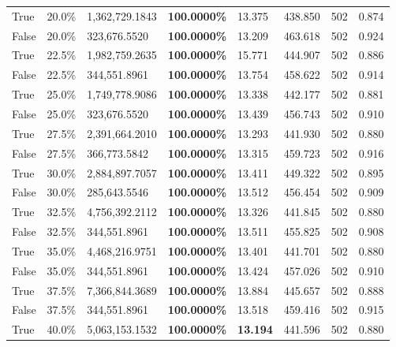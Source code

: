 \begin{table}[H]
\begin{tabular}{lllrllll}
\cline{1-8}
True & 20.0\% & 1,362,729.1843 & \bfseries \color{red} 100.0000\% & 13.375 & 438.850 & 502 & 0.874 \\
\cline{1-8}
False & 20.0\% & 323,676.5520 & \bfseries \color{red} 100.0000\% & 13.209 & 463.618 & 502 & 0.924 \\
\cline{1-8}
True & 22.5\% & 1,982,759.2635 & \bfseries \color{red} 100.0000\% & 15.771 & 444.907 & 502 & 0.886 \\
\cline{1-8}
False & 22.5\% & 344,551.8961 & \bfseries \color{red} 100.0000\% & 13.754 & 458.622 & 502 & 0.914 \\
\cline{1-8}
True & 25.0\% & 1,749,778.9086 & \bfseries \color{red} 100.0000\% & 13.338 & 442.177 & 502 & 0.881 \\
\cline{1-8}
False & 25.0\% & 323,676.5520 & \bfseries \color{red} 100.0000\% & 13.439 & 456.743 & 502 & 0.910 \\
\cline{1-8}
True & 27.5\% & 2,391,664.2010 & \bfseries \color{red} 100.0000\% & 13.293 & 441.930 & 502 & 0.880 \\
\cline{1-8}
False & 27.5\% & 366,773.5842 & \bfseries \color{red} 100.0000\% & 13.315 & 459.723 & 502 & 0.916 \\
\cline{1-8}
True & 30.0\% & 2,884,897.7057 & \bfseries \color{red} 100.0000\% & 13.411 & 449.322 & 502 & 0.895 \\
\cline{1-8}
False & 30.0\% & \color{red} 285,643.5546 & \bfseries \color{red} 100.0000\% & 13.512 & 456.454 & 502 & 0.909 \\
\cline{1-8}
True & 32.5\% & 4,756,392.2112 & \bfseries \color{red} 100.0000\% & 13.326 & 441.845 & 502 & 0.880 \\
\cline{1-8}
False & 32.5\% & 344,551.8961 & \bfseries \color{red} 100.0000\% & 13.511 & 455.825 & 502 & 0.908 \\
\cline{1-8}
True & 35.0\% & 4,468,216.9751 & \bfseries \color{red} 100.0000\% & 13.401 & 441.701 & 502 & 0.880 \\
\cline{1-8}
False & 35.0\% & 344,551.8961 & \bfseries \color{red} 100.0000\% & 13.424 & 457.026 & 502 & 0.910 \\
\cline{1-8}
True & 37.5\% & 7,366,844.3689 & \bfseries \color{red} 100.0000\% & 13.884 & 445.657 & 502 & 0.888 \\
\cline{1-8}
False & 37.5\% & 344,551.8961 & \bfseries \color{red} 100.0000\% & 13.518 & 459.416 & 502 & 0.915 \\
\cline{1-8}
True & 40.0\% & 5,063,153.1532 & \bfseries \color{red} 100.0000\% & \bfseries \color{red} 13.194 & 441.596 & 502 & 0.880 \\

\end{tabular}
\end{table}
